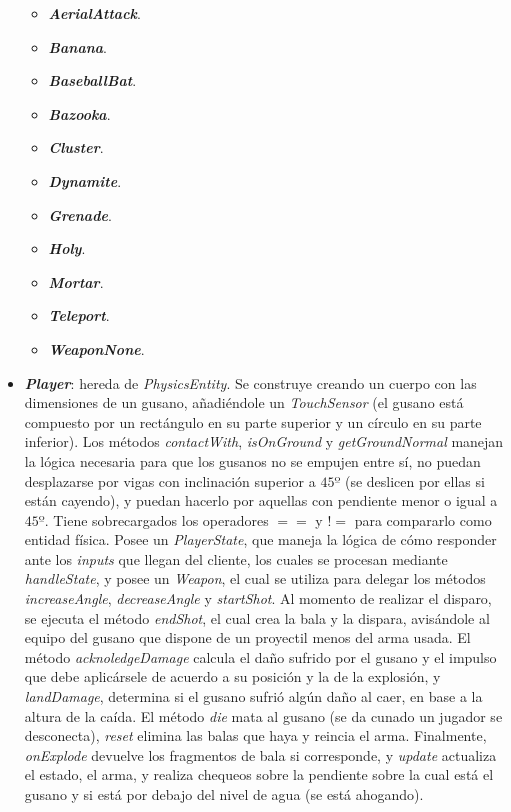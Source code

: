 \begin{itemize}
	\begin{itemize}
		\item \textbf{\textit{AerialAttack}}.
		\item \textbf{\textit{Banana}}.
		\item \textbf{\textit{BaseballBat}}.
		\item \textbf{\textit{Bazooka}}.
		\item \textbf{\textit{Cluster}}.
		\item \textbf{\textit{Dynamite}}.
		\item \textbf{\textit{Grenade}}.
		\item \textbf{\textit{Holy}}.
		\item \textbf{\textit{Mortar}}.
		\item \textbf{\textit{Teleport}}.
		\item \textbf{\textit{WeaponNone}}.
	\end{itemize}
	
	\item \textbf{\textit{Player}}: hereda de \textit{PhysicsEntity}. Se construye creando un cuerpo con las dimensiones de un gusano, añadiéndole un \textit{TouchSensor} (el gusano está compuesto por un rectángulo en su parte superior y un círculo en su parte inferior). Los métodos \textit{contactWith}, \textit{isOnGround} y \textit{getGroundNormal} manejan la lógica necesaria para que los gusanos no se empujen entre sí, no puedan desplazarse por vigas con inclinación superior a $45º$ (se deslicen por ellas si están cayendo), y puedan hacerlo por aquellas con pendiente menor o igual a $45º$. Tiene sobrecargados los operadores $==$ y $!=$ para compararlo como entidad física. Posee un \textit{PlayerState}, que maneja la lógica de cómo responder ante los \textit{inputs} que llegan del cliente, los cuales se procesan mediante \textit{handleState}, y posee un \textit{Weapon}, el cual se utiliza para delegar los métodos \textit{increaseAngle}, \textit{decreaseAngle} y \textit{startShot}. Al momento de realizar el disparo, se ejecuta el método \textit{endShot}, el cual crea la bala y la dispara, avisándole al equipo del gusano que dispone de un proyectil menos del arma usada. El método \textit{acknoledgeDamage} calcula el daño sufrido por el gusano y el impulso que debe aplicársele de acuerdo a su posición y la de la explosión, y \textit{landDamage}, determina si el gusano sufrió algún daño al caer, en base a la altura de la caída. El método \textit{die} mata al gusano (se da cunado un jugador se desconecta), \textit{reset} elimina las balas que haya y reincia el arma. Finalmente, \textit{onExplode} devuelve los fragmentos de bala si corresponde, y \textit{update} actualiza el estado, el arma, y realiza chequeos sobre la pendiente sobre la cual está el gusano y si está por debajo del nivel de agua (se está ahogando).
	

\end{itemize}
